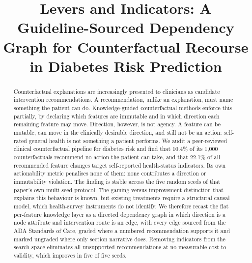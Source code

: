 \documentclass[conference]{IEEEtran}
\begin{document}
\title{Levers and Indicators: A Guideline-Sourced Dependency Graph for Counterfactual Recourse in Diabetes Risk Prediction}

\author{
}

\maketitle

\begin{abstract}
Counterfactual explanations are increasingly presented to clinicians as candidate intervention recommendations. A recommendation, unlike an explanation, must name something the patient can do. Knowledge-guided counterfactual methods enforce this partially, by declaring which features are immutable and in which direction each remaining feature may move. Direction, however, is not agency. A feature can be mutable, can move in the clinically desirable direction, and still not be an action: self-rated general health is not something a patient performs. We audit a peer-reviewed clinical counterfactual pipeline for diabetes risk and find that 10.4\% of its 1{,}000 counterfactuals recommend no action the patient can take, and that 22.1\% of all recommended feature changes target self-reported health-status indicators. Its own actionability metric penalises none of them: none contributes a direction or immutability violation. The finding is stable across the five random seeds of that paper's own multi-seed protocol. The gaming-versus-improvement distinction that explains this behaviour is known, but existing treatments require a structural causal model, which health-survey instruments do not identify. We therefore recast the flat per-feature knowledge layer as a directed dependency graph in which direction is a node attribute and intervention route is an edge, with every edge sourced from the ADA Standards of Care, graded where a numbered recommendation supports it and marked ungraded where only section narrative does. Removing indicators from the search space eliminates all unsupported recommendations at no measurable cost to validity, which improves in five of five seeds.
\end{abstract}
\end{document}
